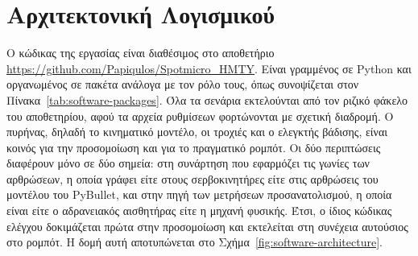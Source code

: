 \documentclass[11pt]{report}
\begin{document}
\section{Αρχιτεκτονική Λογισμικού}
\label{sec:software-architecture}
Ο κώδικας της εργασίας είναι διαθέσιμος στο αποθετήριο
\url{https://github.com/Papiqulos/Spotmicro_HMTY}. Είναι γραμμένος σε Python και
οργανωμένος σε πακέτα ανάλογα με τον ρόλο τους, όπως συνοψίζεται στον
Πίνακα~\ref{tab:software-packages}. Όλα τα σενάρια εκτελούνται από τον ριζικό
φάκελο του αποθετηρίου, αφού τα αρχεία ρυθμίσεων φορτώνονται με σχετική
διαδρομή. Ο πυρήνας, δηλαδή το κινηματικό
μοντέλο, οι τροχιές και ο ελεγκτής βάδισης, είναι κοινός για την προσομοίωση και
για το πραγματικό ρομπότ. Οι δύο περιπτώσεις διαφέρουν μόνο σε δύο σημεία: στη
συνάρτηση που εφαρμόζει τις γωνίες των αρθρώσεων, η οποία γράφει είτε στους
σερβοκινητήρες είτε στις αρθρώσεις του μοντέλου του PyBullet, και στην πηγή των
μετρήσεων προσανατολισμού, η οποία είναι είτε ο αδρανειακός αισθητήρας είτε η
μηχανή φυσικής. Έτσι, ο ίδιος κώδικας ελέγχου δοκιμάζεται πρώτα στην
προσομοίωση και εκτελείται στη συνέχεια αυτούσιος στο ρομπότ. Η δομή αυτή
αποτυπώνεται στο Σχήμα~\ref{fig:software-architecture}.
\end{document}

